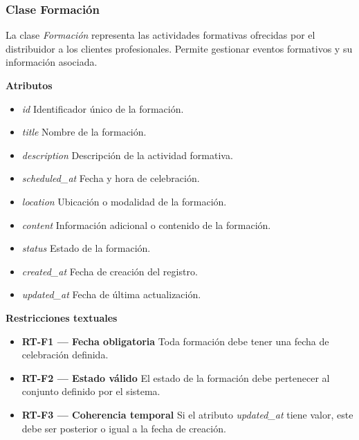 \subsubsection{Clase Formación}

La clase \textit{Formación} representa las actividades formativas ofrecidas por el distribuidor a los clientes profesionales. Permite gestionar eventos formativos y su información asociada.

\textbf{Atributos}

\begin{itemize}

      \item \textit{id}
            Identificador único de la formación.
      \item \textit{title}
            Nombre de la formación.
      \item \textit{description}
            Descripción de la actividad formativa.
      \item \textit{scheduled\_at}
            Fecha y hora de celebración.
      \item \textit{location}
            Ubicación o modalidad de la formación.
      \item \textit{content}
            Información adicional o contenido de la formación.
      \item \textit{status}
            Estado de la formación.
      \item \textit{created\_at}
            Fecha de creación del registro.
      \item \textit{updated\_at}
            Fecha de última actualización.

\end{itemize}

\textbf{Restricciones textuales}

\begin{itemize}

      \item \textbf{RT-F1 — Fecha obligatoria}
            Toda formación debe tener una fecha de celebración definida.
      \item \textbf{RT-F2 — Estado válido}
            El estado de la formación debe pertenecer al conjunto definido por el sistema.
      \item \textbf{RT-F3 — Coherencia temporal}
            Si el atributo \textit{updated\_at} tiene valor, este debe ser posterior o igual a la fecha de creación.

\end{itemize}

